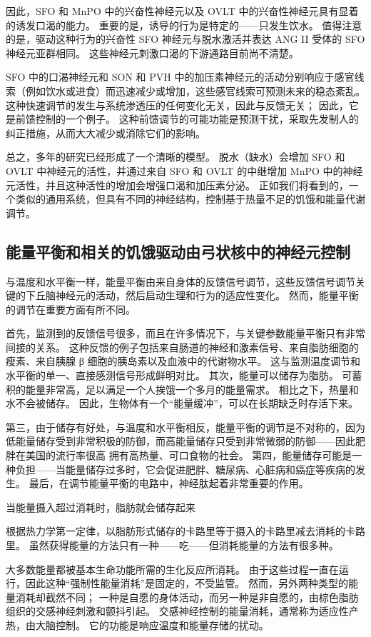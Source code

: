 因此，SFO 和 MnPO 中的兴奋性神经元以及 OVLT 中的兴奋性神经元具有显着的诱发口渴的能力。 重要的是，诱导的行为是特定的——只发生饮水。 值得注意的是，驱动这种行为的兴奋性 SFO 神经元与脱水激活并表达 ANG II 受体的 SFO 神经元亚群相同。 这些神经元刺激口渴的下游通路目前尚不清楚。

SFO 中的口渴神经元和 SON 和 PVH 中的加压素神经元的活动分别响应于感官线索（例如饮水或进食）而迅速减少或增加，这些感官线索可预测未来的稳态紊乱。 这种快速调节的发生与系统渗透压的任何变化无关，因此与反馈无关； 因此，它是前馈控制的一个例子。 这种前馈调节的可能功能是预测干扰，采取先发制人的纠正措施，从而大大减少或消除它们的影响。

总之，多年的研究已经形成了一个清晰的模型。 脱水（缺水）会增加 SFO 和 OVLT 中神经元的活性，并通过来自 SFO 和 OVLT 的中继增加 MnPO 中的神经元活性，并且这种活性的增加会增强口渴和加压素分泌。 正如我们将看到的，一个类似的通用系统，但具有不同的神经结构，控制基于热量不足的饥饿和能量代谢调节。

\subsection{能量平衡和相关的饥饿驱动由弓状核中的神经元控制}
与温度和水平衡一样，能量平衡由来自身体的反馈信号调节，这些反馈信号调节关键的下丘脑神经元的活动，然后启动生理和行为的适应性变化。 然而，能量平衡的调节在重要方面有所不同。

首先，监测到的反馈信号很多，而且在许多情况下，与关键参数能量平衡只有非常间接的关系。 这种反馈的例子包括来自肠道的神经和激素信号、来自脂肪细胞的瘦素、来自胰腺 β 细胞的胰岛素以及血液中的代谢物水平。 这与监测温度调节和水平衡的单一、直接感测信号形成鲜明对比。 其次，能量可以储存为脂肪。 可蓄积的能量非常高，足以满足一个人挨饿一个多月的能量需求。 相比之下，热量和水不会被储存。 因此，生物体有一个“能量缓冲”，可以在长期缺乏时存活下来。

第三，由于储存有好处，与温度和水平衡相反，能量平衡的调节是不对称的，因为低能量储存受到非常积极的防御，而高能量储存只受到非常微弱的防御——因此肥胖在美国的流行率很高 拥有高热量、可口食物的社会。 第四，能量储存可能是一种负担——当能量储存过多时，它会促进肥胖、糖尿病、心脏病和癌症等疾病的发生。 最后，在调节能量平衡的电路中，神经肽起着非常重要的作用。

当能量摄入超过消耗时，脂肪就会储存起来

根据热力学第一定律，以脂肪形式储存的卡路里等于摄入的卡路里减去消耗的卡路里。 虽然获得能量的方法只有一种——吃——但消耗能量的方法有很多种。

大多数能量都被基本生命功能所需的生化反应所消耗。 由于这些过程一直在运行，因此这种“强制性能量消耗”是固定的，不受监管。 然而，另外两种类型的能量消耗却截然不同； 一种是自愿的身体活动，而另一种是非自愿的，由棕色脂肪组织的交感神经刺激和颤抖引起。 交感神经控制的能量消耗，通常称为适应性产热，由大脑控制。 它的功能是响应温度和能量存储的扰动。

